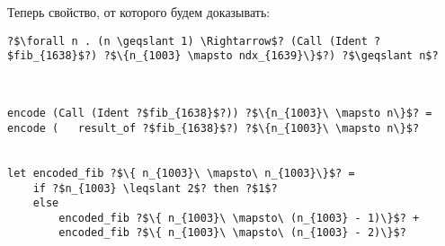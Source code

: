 \documentclass{article}
\begin{document}
Теперь свойство, от которого будем доказывать: 
\begin{verbatim}
?$\forall n . (n \geqslant 1) \Rightarrow$? (Call (Ident ?$fib_{1638}$?) ?$\{n_{1003} \mapsto ndx_{1639}\}$?) ?$\geqslant n$?
\end{verbatim}

\begin{verbatim}


encode (Call (Ident ?$fib_{1638}$?)) ?$\{n_{1003}\ \mapsto n\}$? = 
encode (   result_of ?$fib_{1638}$?) ?$\{n_{1003}\ \mapsto n\}$?


let encoded_fib ?$\{ n_{1003}\ \mapsto\ n_{1003}\}$? = 
    if ?$n_{1003} \leqslant 2$? then ?$1$?
    else 
        encoded_fib ?$\{ n_{1003}\ \mapsto\ (n_{1003} - 1)\}$? +  
        encoded_fib ?$\{ n_{1003}\ \mapsto\ (n_{1003} - 2)\}$?
\end{verbatim}
\end{document}
